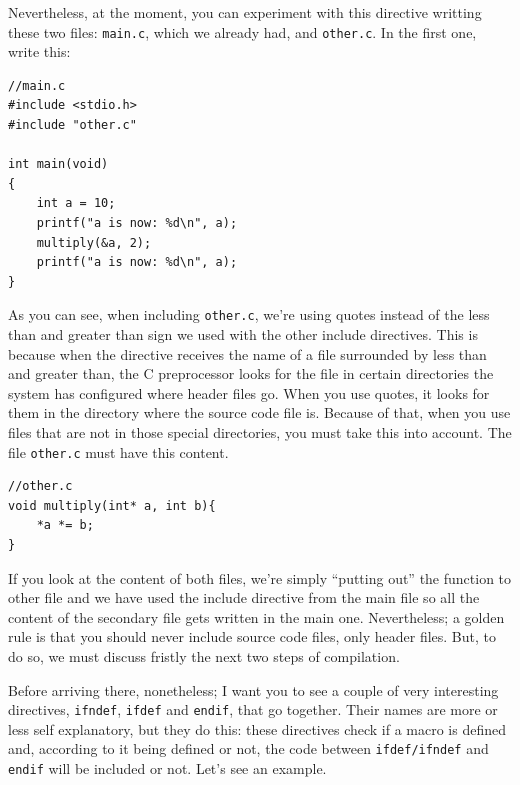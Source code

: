 \documentclass[a4paper]{article}
\begin{document}
Nevertheless, at the moment, you can experiment with this directive writting
these two files: \verb!main.c!, which we already had, and \verb!other.c!. In the
first one, write this:

\noindent
\begin{minipage}[H]{\linewidth}
\mbox{}
\begin{lstlisting}[style=C,
caption={Example of \texttt{include} directive, main file},
label={lst:include1}]
//main.c
#include <stdio.h>
#include "other.c"

int main(void)
{
    int a = 10;
    printf("a is now: %d\n", a);
    multiply(&a, 2);
    printf("a is now: %d\n", a);
}
\end{lstlisting}
\end{minipage}

As you can see, when including \verb!other.c!, we're using quotes instead of the
less than and greater than sign we used with the other include directives. This
is because when the directive receives the name of a file surrounded by less
than and greater than, the C preprocessor looks for the file in certain
directories the system has configured where header files go. When you use
quotes, it looks for them in the directory where the source code file is.
Because of that, when you use files that are not in those special directories,
you must take this into account. The file \verb!other.c! must have this content.

\noindent
\begin{minipage}[H]{\linewidth}
\mbox{}
\begin{lstlisting}[style=C,
caption={Example of \texttt{include} directive, included file},
label={lst:include2}]
//other.c
void multiply(int* a, int b){
    *a *= b;
}
\end{lstlisting}
\end{minipage}

If you look at the content of both files, we're simply ``putting out'' the
function to other file and we have used the include directive from the main file
so all the content of the secondary file gets written in the main one.
Nevertheless; a golden rule is that you should never include source code files,
only header files. But, to do so, we must discuss fristly the next two steps
of compilation.

Before arriving there, nonetheless; I want you to see a couple of very
interesting directives, \verb!ifndef!, \verb!ifdef! and \verb!endif!, that go
together. Their names are more or less self explanatory, but they do this: these
directives check if a macro is defined and, according to it being defined or
not, the code between \verb!ifdef/ifndef! and \verb!endif! will be included or
not. Let's see an example.
\end{document}

